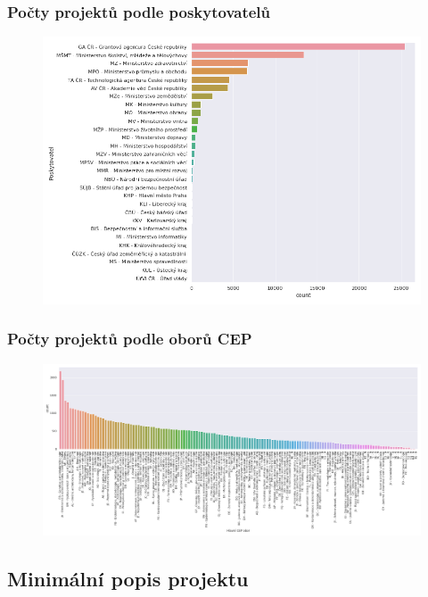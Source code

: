 \documentclass{beamer}
\begin{document}
\begin{frame}
  \frametitle{Počty projektů podle poskytovatelů}

  \begin{figure}[!h]
      \centering
      \includegraphics[width=.85\textwidth,height=\textheight,keepaspectratio]{figures/poskytovatele.png}
      \label{fig:poskytovatele}
  \end{figure}

\end{frame}

\begin{frame}
  \frametitle{Počty projektů podle oborů CEP}

  \begin{figure}[!h]
      \centering
      \includegraphics[width=\textwidth,height=\textheight,keepaspectratio]{figures/obory.png}
      \label{fig:obory}
  \end{figure}

\end{frame}


\subsection{Minimální popis projektu}
\end{document}

